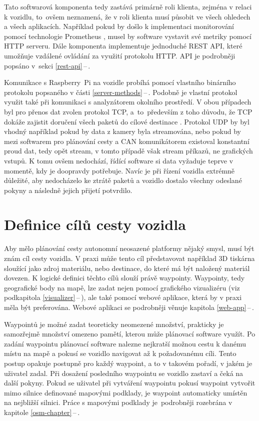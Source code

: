 \documentclass[czech, bachelor]{diploma}
\newcommand{\peteref}[1]{\ref{#1}\,--\,\nameref{#1}}
\begin{document}
Tato softwarová komponenta tedy zastává primárně roli klienta, zejména v relaci k vozidlu, to~ovšem neznamená, že v roli klienta
musí působit ve všech ohledech a všech aplikacích. Například pokud by došlo k implementaci monitorování pomocí technologie
Prometheus \cite{prometheus-source}, musel by software vystavit své metriky pomocí HTTP serveru. Dále komponenta implementuje
jednoduché REST API, které umožňuje vzdálené ovládání za využití protokolu HTTP. API je podrobněji popsáno v~sekci 
\peteref{rest-api}.

Komunikace s Raspberry~Pi na vozidle probíhá pomocí vlastního binárního protokolu popsaného v části \peteref{server-methods}.
Podobně je vlastní protokol využit také při komunikaci s analyzátorem okolního prostředí. V obou případech byl pro přenos dat
zvolen protokol TCP, a~to~především z toho důvodu, že TCP dokáže zajistit doručení všech paketů do cílové destinace
\cite{tcp-source}. Protokol UDP \cite{udp-source} by byl vhodný například pokud by data z kamery byla streamována, nebo pokud by
mezi softwarem pro plánování cesty a CAN komunikátorem existoval konstantní proud dat, tedy opět stream, v tomto případě však
stream příkazů, ne grafických vstupů. K tomu ovšem nedochází, řídící software si data vyžaduje teprve v momentě, kdy je doopravdy
potřebuje. Navíc je při řízení vozidla extrémně důležité, aby nedocházelo ke ztrátě paketů a vozidlo dostalo všechny odeslané
pokyny a následně jejich přijetí potvrdilo.

\section{Definice cílů cesty vozidla} \label{target-definition}

Aby mělo plánování cesty autonomní neosazené platformy nějaký smysl, musí být znám cíl cesty vozidla. V praxi může tento cíl
představovat například 3D tiskárna sloužící jako zdroj materiálu, nebo destinace, do které má být naložený materiál dovezen.
K logické definici těchto cílů slouží právě waypointy. Waypointy, tedy geografické body na mapě, lze zadat nejen pomocí grafického
vizualizéru (viz podkapitola \peteref{visualizer}), ale také pomocí webové aplikace, která by v praxi měla být preferována.
Webové aplikaci se podrobněji věnuje kapitola \peteref{web-app}.

Waypointů je možné zadat teoreticky neomezené množství, prakticky je samozřejmě množství omezeno pamětí, kterou může plánovací
software využít. Po zadání waypointu plánovací software nalezne nejkratší možnou cestu k danému místu na mapě a pokusí se vozidlo
navigovat až k požadovanému cíli. Tento postup opakuje postupně pro každý waypoint, a to v takovém pořadí, v jakém je uživatel
zadal. Při dosažení posledního waypointu se vozidlo zastaví a čeká na další pokyny. Pokud se uživatel při vytváření waypointu
pokusí waypoint vytvořit mimo silnice definované mapovými podklady, je waypoint automaticky umístěn na nejbližší silnici.
Práce s mapovými podklady je~podrobněji rozebrána v kapitole \peteref{osm-chapter}.
\end{document}
